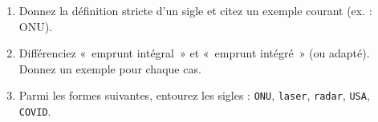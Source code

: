 \documentclass[11pt]{article}
\begin{document}
\begin{exercice}
\begin{enumerate}
    \item Donnez la définition stricte d'un sigle et citez un exemple courant (ex. : ONU).
    \item Différenciez «~emprunt intégral~» et «~emprunt intégré~» (ou adapté). Donnez un exemple pour chaque cas.
    \item Parmi les formes suivantes, entourez les sigles : \texttt{ONU}, \texttt{laser}, \texttt{radar}, \texttt{USA}, \texttt{COVID}.
\end{enumerate}
\end{exercice}
\end{document}
